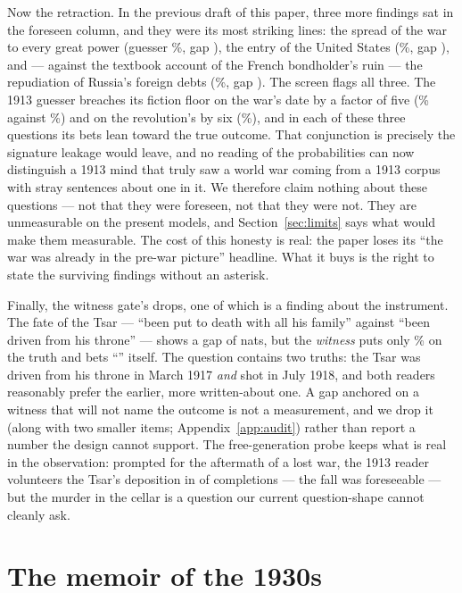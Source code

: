 \documentclass[11pt]{article}
\begin{document}
Now the retraction. In the previous draft of this paper, three more findings sat in the foreseen column,
and they were its most striking lines: the spread of the war to every great power (guesser
\NbreadthPre\%, gap \NbreadthGap), the entry of the United States (\NusentryPre\%, gap \NusentryGap), and
--- against the textbook account of the French bondholder's ruin --- the repudiation of Russia's foreign
debts (\NdebtsPre\%, gap \NdebtsGap). The screen flags all three. The 1913 guesser breaches its fiction
floor on the war's date by a factor of five (\NdateWar\% against \NfloorThirteen\%) and on the
revolution's by six (\NdateRev\%), and in each of these three questions its bets lean toward the true
outcome. That conjunction is precisely the signature leakage would leave, and no reading of the
probabilities can now distinguish a 1913 mind that truly saw a world war coming from a 1913 corpus with
stray sentences about one in it. We therefore claim nothing about these questions --- not that they were
foreseen, not that they were not. They are unmeasurable on the present models, and Section~\ref{sec:limits}
says what would make them measurable. The cost of this honesty is real: the paper loses its ``the war was
already in the pre-war picture'' headline. What it buys is the right to state the surviving findings
without an asterisk.

Finally, the witness gate's drops, one of which is a finding about the instrument. The fate of the Tsar
--- ``been put to death with all his family'' against ``been driven from his throne'' --- shows a gap of
\NtsarGap{} nats, but the \emph{witness} puts only \NtsarWitnessP\% on the truth and bets
``\NtsarWitnessBet'' itself. The question contains two truths: the Tsar was driven from his throne in
March 1917 \emph{and} shot in July 1918, and both readers reasonably prefer the earlier, more
written-about one. A gap anchored on a witness that will not name the outcome is not a measurement, and
we drop it (along with two smaller items; Appendix~\ref{app:audit}) rather than report a number the
design cannot support. The free-generation probe keeps what is real in the observation: prompted for the
aftermath of a lost war, the 1913 reader volunteers the Tsar's deposition in \NfreeTsarTh{} of
completions --- the fall was foreseeable --- but the murder in the cellar is a question our current
question-shape cannot cleanly ask.

\section{The memoir of the 1930s}\label{sec:memoir}
\end{document}
